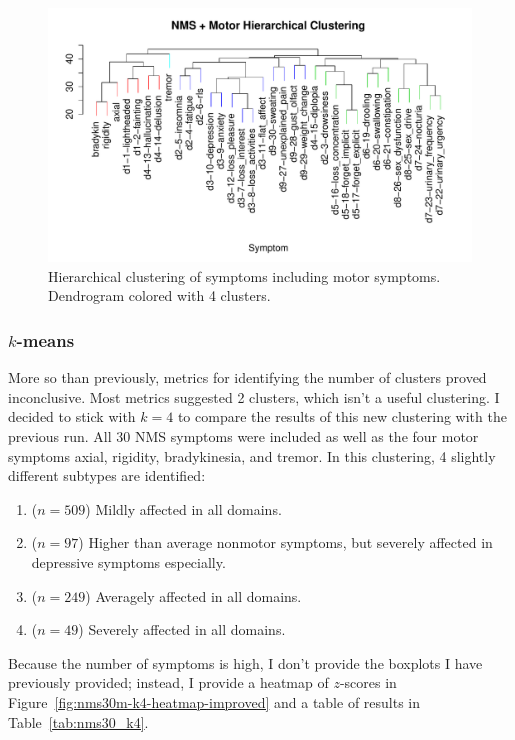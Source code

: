 \documentclass[10pt]{article}
\begin{document}
\begin{multicols}{2}
\begin{figure}[p]
  \centering
  \includegraphics[width=\linewidth]{nms30m-colhc.pdf} \caption{Hierarchical clustering of symptoms
  including motor symptoms.  Dendrogram colored with 4 clusters.}
  \label{fig:nms30m-colhc}
\end{figure}

\subsubsection{$k$-means}

More so than previously, metrics for identifying the number of clusters proved inconclusive. Most
metrics suggested 2 clusters, which isn't a useful clustering. I decided to stick with $k = 4$ to
compare the results of this new clustering with the previous run. All 30 NMS symptoms were included
as well as the four motor symptoms axial, rigidity, bradykinesia, and tremor.
In this clustering, 4 slightly different subtypes are identified:

\begin{enumerate}
  \item ($n = 509$) Mildly affected in all domains.
  \item ($n = 97$) Higher than average nonmotor symptoms, but severely affected in depressive
    symptoms especially.
  \item ($n = 249$) Averagely affected in all domains.
  \item ($n = 49$) Severely affected in all domains.
\end{enumerate}

Because the number of symptoms is high, I don't provide the boxplots I have previously provided;
instead, I provide a heatmap of $z$-scores in Figure~\ref{fig:nms30m-k4-heatmap-improved} and a
table of results in Table~\ref{tab:nms30_k4}.


\end{multicols}
\end{document}
